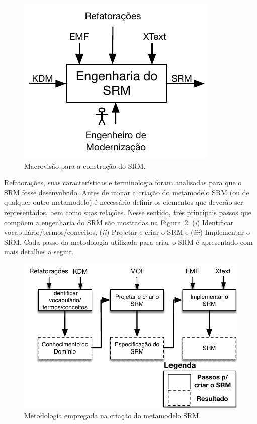 \begin{figure}[h]
	\centering
	\caption{Macrovisão para a construção do SRM.}
	\label{fig:fases_para_a_construcao_e_uso_do_SRM}
	\includegraphics[scale=0.9]{images/engenhariaDoSRM}
	\fautor
\end{figure}


Refatorações, suas características e terminologia foram analisadas para que o SRM fosse desenvolvido. Antes de iniciar a criação do metamodelo SRM (ou de qualquer outro metamodelo) é necessário definir os elementos que deverão ser representados, bem como suas relações. Nesse sentido, três principais passos que compõem a engenharia do SRM são mostradas na Figura~\ref{fig:etapas_da_fase_de_e_do_SRM}: (\textit{i})  Identificar vocabulário/termos/conceitos, (\textit{ii}) Projetar e criar o SRM e (\textit{iii}) Implementar o SRM. Cada passo da metodologia utilizada para criar o SRM é apresentado com mais detalhes a seguir.

\begin{figure}[h]
	\centering
	\caption{Metodologia empregada na criação do metamodelo SRM.}
	\label{fig:etapas_da_fase_de_e_do_SRM}
	\includegraphics[scale=0.65]{images/metodologiaParaCriarOSRM}
	\fautor
\end{figure}



